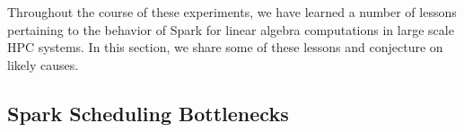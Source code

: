 Throughout the course of these experiments, we have learned a number of lessons pertaining to the behavior of Spark for linear algebra computations in large scale HPC systems. 
In this section, we share some of these lessons and conjecture on likely causes.
\subsection{Spark Scheduling Bottlenecks}

\begin{table}[th]
\centering
{}
\caption{Spark scheduling delays}
\label{tab:scheduling}
\end{table}
